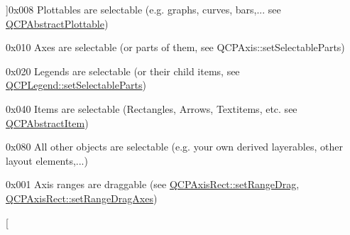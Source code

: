 \begin{Desc}
\begin{description}
{}]{\ttfamily 0x008} Plottables are selectable (e.\+g. graphs, curves, bars,... see \hyperlink{class_q_c_p_abstract_plottable}{Q\+C\+P\+Abstract\+Plottable}) \item[{\em 
i\+Select\+Axes\hypertarget{namespace_q_c_p_a2ad6bb6281c7c2d593d4277b44c2b037a7f49c26c8cf12373ac867d63737c62b9}{}\label{namespace_q_c_p_a2ad6bb6281c7c2d593d4277b44c2b037a7f49c26c8cf12373ac867d63737c62b9}
}]{\ttfamily 0x010} Axes are selectable (or parts of them, see Q\+C\+P\+Axis\+::set\+Selectable\+Parts) \item[{\em 
i\+Select\+Legend\hypertarget{namespace_q_c_p_a2ad6bb6281c7c2d593d4277b44c2b037a2b0800bffd93fc13090670eabf0fe1db}{}\label{namespace_q_c_p_a2ad6bb6281c7c2d593d4277b44c2b037a2b0800bffd93fc13090670eabf0fe1db}
}]{\ttfamily 0x020} Legends are selectable (or their child items, see \hyperlink{class_q_c_p_legend_a9ce60aa8bbd89f62ae4fa83ac6c60110}{Q\+C\+P\+Legend\+::set\+Selectable\+Parts}) \item[{\em 
i\+Select\+Items\hypertarget{namespace_q_c_p_a2ad6bb6281c7c2d593d4277b44c2b037a271679ebb13ab4a6b4c2c2d9459f1de8}{}\label{namespace_q_c_p_a2ad6bb6281c7c2d593d4277b44c2b037a271679ebb13ab4a6b4c2c2d9459f1de8}
}]{\ttfamily 0x040} Items are selectable (Rectangles, Arrows, Textitems, etc. see \hyperlink{class_q_c_p_abstract_item}{Q\+C\+P\+Abstract\+Item}) \item[{\em 
i\+Select\+Other\hypertarget{namespace_q_c_p_a2ad6bb6281c7c2d593d4277b44c2b037a2ba96f62595bc22603da0e575b589a83}{}\label{namespace_q_c_p_a2ad6bb6281c7c2d593d4277b44c2b037a2ba96f62595bc22603da0e575b589a83}
}]{\ttfamily 0x080} All other objects are selectable (e.\+g. your own derived layerables, other layout elements,...) \item[{\em 
i\+Range\+Drag\hypertarget{namespace_q_c_p_a2ad6bb6281c7c2d593d4277b44c2b037a15aab687b04f7ecf86506102b41b0900}{}\label{namespace_q_c_p_a2ad6bb6281c7c2d593d4277b44c2b037a15aab687b04f7ecf86506102b41b0900}
}]{\ttfamily 0x001} Axis ranges are draggable (see \hyperlink{class_q_c_p_axis_rect_ae6aef2f7211ba6097c925dcd26008418}{Q\+C\+P\+Axis\+Rect\+::set\+Range\+Drag}, \hyperlink{class_q_c_p_axis_rect_a648cce336bd99daac4a5ca3e5743775d}{Q\+C\+P\+Axis\+Rect\+::set\+Range\+Drag\+Axes}) \item[{\em 
}
\end{description}
\end{Desc}
